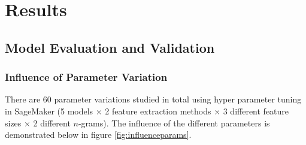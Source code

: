 \documentclass[a4paper,12pt,nottoc]{article}
\begin{document}
\clearpage
\section{Results}

\subsection{Model Evaluation and Validation}

\subsubsection{Influence of Parameter Variation}

There are 60 parameter variations studied in total using hyper parameter tuning in SageMaker \cite{bib:sagemaker} (5 models $\times$ 2 feature extraction methods $\times$ 3 different feature sizes $\times$ 2 different $n$-grams). The influence of the different parameters is demonstrated below in figure \ref{fig:influenceparams}.
\end{document}
